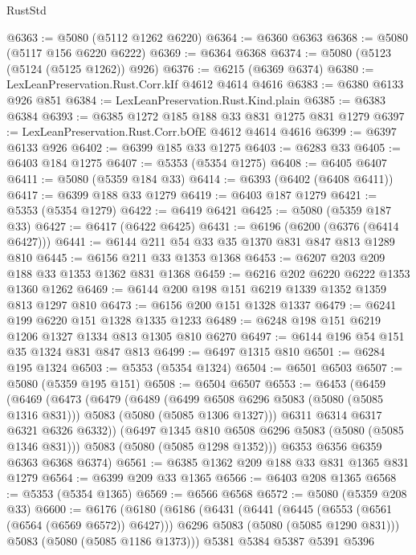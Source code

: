 \begin{lexlean}{RustStd}
\begin{coremodule}
@6363 := @5080 (@5112 @1262 @6220)
@6364 := @6360 @6363
@6368 := @5080 (@5117 @156 @6220 @6222)
@6369 := @6364 @6368
@6374 := @5080 (@5123 (@5124 (@5125 @1262)) @926)
@6376 := @6215 (@6369 @6374)
@6380 := LexLeanPreservation.Rust.Corr.kIf @4612 @4614 @4616
@6383 := @6380 @6133 @926 @851
@6384 := LexLeanPreservation.Rust.Kind.plain
@6385 := @6383 @6384
@6393 := @6385 @1272 @185 @188 @33 @831 @1275 @831 @1279
@6397 := LexLeanPreservation.Rust.Corr.bOfE @4612 @4614 @4616
@6399 := @6397 @6133 @926
@6402 := @6399 @185 @33 @1275
@6403 := @6283 @33
@6405 := @6403 @184 @1275
@6407 := @5353 (@5354 @1275)
@6408 := @6405 @6407
@6411 := @5080 (@5359 @184 @33)
@6414 := @6393 (@6402 (@6408 @6411))
@6417 := @6399 @188 @33 @1279
@6419 := @6403 @187 @1279
@6421 := @5353 (@5354 @1279)
@6422 := @6419 @6421
@6425 := @5080 (@5359 @187 @33)
@6427 := @6417 (@6422 @6425)
@6431 := @6196 (@6200 (@6376 (@6414 @6427)))
@6441 := @6144 @211 @54 @33 @35 @1370 @831 @847 @813 @1289 @810
@6445 := @6156 @211 @33 @1353 @1368
@6453 := @6207 @203 @209 @188 @33 @1353 @1362 @831 @1368
@6459 := @6216 @202 @6220 @6222 @1353 @1360 @1262
@6469 := @6144 @200 @198 @151 @6219 @1339 @1352 @1359 @813 @1297 @810
@6473 := @6156 @200 @151 @1328 @1337
@6479 := @6241 @199 @6220 @151 @1328 @1335 @1233
@6489 := @6248 @198 @151 @6219 @1206 @1327 @1334 @813 @1305 @810 @6270
@6497 := @6144 @196 @54 @151 @35 @1324 @831 @847 @813
@6499 := @6497 @1315 @810
@6501 := @6284 @195 @1324
@6503 := @5353 (@5354 @1324)
@6504 := @6501 @6503
@6507 := @5080 (@5359 @195 @151)
@6508 := @6504 @6507
@6553 := @6453
    (@6459
      (@6469
        (@6473
          (@6479
            (@6489
              (@6499 @6508 @6296 @5083 (@5080 (@5085 @1316 @831)))
              @5083
              (@5080 (@5085 @1306 @1327)))
            @6311
            @6314
            @6317
            @6321
            @6326
            @6332))
        (@6497 @1345 @810 @6508 @6296 @5083 (@5080 (@5085 @1346 @831)))
        @5083
        (@5080 (@5085 @1298 @1352)))
      @6353
      @6356
      @6359
      @6363
      @6368
      @6374)
@6561 := @6385 @1362 @209 @188 @33 @831 @1365 @831 @1279
@6564 := @6399 @209 @33 @1365
@6566 := @6403 @208 @1365
@6568 := @5353 (@5354 @1365)
@6569 := @6566 @6568
@6572 := @5080 (@5359 @208 @33)
@6600 := @6176
    (@6180
      (@6186
        (@6431
          (@6441
            (@6445 (@6553 (@6561 (@6564 (@6569 @6572)) @6427)))
            @6296
            @5083
            (@5080 (@5085 @1290 @831)))
          @5083
          (@5080 (@5085 @1186 @1373)))
        @5381
        @5384
        @5387
        @5391
        @5396

\end{coremodule}
\end{lexlean}

